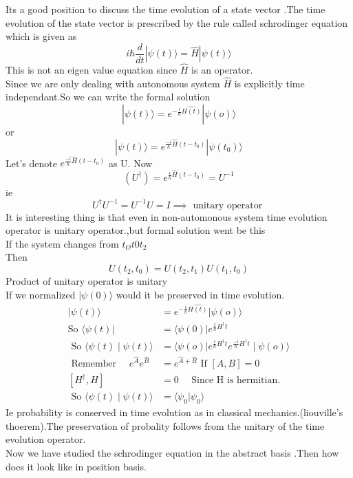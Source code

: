 	Its a good position to discuss the time evolution of a state vector .The time evolution of the state vector is prescribed by the rule called schrodinger equation which is given as\\
$$i\hbar \frac{d}{dt}|\psi(t)\rangle =\hat{H}|\psi(t)\rangle $$
This is not an eigen value equation since $\hat{H}$ is an operator.\\
Since we are only dealing with autonomous system $\hat{H}$ is explicitly time independant.So we can write the formal solution \\
$$|\psi(t) \rangle =e^{-\frac{i}{\hbar}\hat{H(t)}} |\psi(o)\rangle $$
or $$|\psi(t) \rangle =e^{\frac{-i}{\hbar}\hat{H}(t-t_0)} |\psi(t_0)\rangle$$
Let's denote $e^{\frac{-i}{\hbar}\hat{H}(t-t_0)}$ as U.
Now $$(U^{\dagger})=e^{\frac{i}{\hbar}\hat{H}(t-t_0)}=U^{-1}$$
ie $$U^{\dagger}U^{-1}=U^{-1}U=I\implies \text{ unitary operator }$$
It is interesting thing is that even in non-automonous system time evolution operator is unitary operator.,but formal solution went be this \\
If the system changes from $t_O t0 t_2$\\
Then $$U(t_2,t_0)=U(t_2,t_1)U(t_1,t_0)$$
Product of unitary operator is unitary \\
If we normalized $|\psi(0)\rangle$ would it be preserved in time evolution.
$$
\begin{aligned}
	|\psi(t) \rangle &=e^{-\frac{i}{\hbar}\hat{H(t)}} |\psi(o)\rangle \\
	\text{So }\langle \psi(t)|&=\langle \psi(0)|e^{\frac{i}{\hbar}
		H^{\dagger}t}\\
\text{	So }\langle \psi(t)\mid \psi(t)\rangle&=\langle \psi(o)|e^{\frac{i}{\hbar}H^{\dagger}t}e^{\frac{-i}{\hbar}H^{\dagger}t}\mid \psi(o)\rangle\\
\text{	Remember }\quad e^{\hat{A}}e^{\hat{B}}&=e^{\hat{A}+\hat{B}}
\text{	If }\left[ A,B\right] =0\\
	 \left[ H^{\dagger},H\right] &=0 \quad\text{ Since H is hermitian.}\\
\text{	So }\langle \psi(t)\mid \psi(t)\rangle&=\langle \psi_{0}|\psi_{0}\rangle
\end{aligned}
$$
Ie probability is conserved in time evolution as in classical mechanics.(liouville's thoerem).The preservation of probality follows from the unitary of the time evolution operator.\\
Now we have studied the schrodinger equation in the abstract basis .Then how does it look like in position basis.\\

